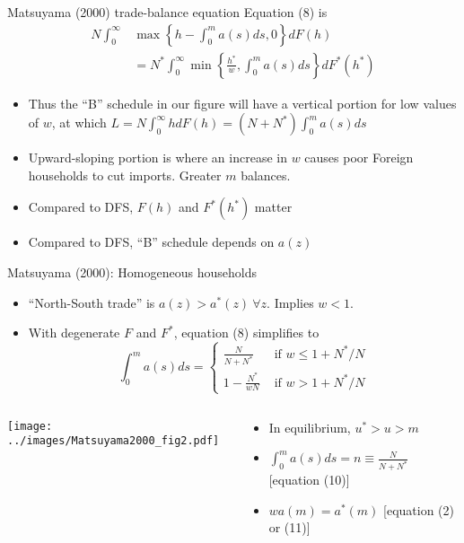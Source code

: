 \documentclass[10pt,notes=hide]{beamer}
\begin{document}
\begin{frame}{Matsuyama (2000) trade-balance equation}
Equation (8) is
\begin{align*} 
N \int_{0}^{\infty} &\max \left\{h-\int_{0}^{m}a(s) ds,0\right\} dF(h) 
\\ 
&= 
N^{*} \int_{0}^{\infty} \min \left\{\frac{h^*}{w},\int_{0}^{m}a(s) ds\right\} dF^{*}(h^*)
\end{align*}
\vspace{-4mm}
\begin{itemize}
	\item Thus the ``B'' schedule in our figure will have a vertical portion for low values of $w$,
	at which $L = N \int_{0}^{\infty} h dF(h) = (N+N^*)\int_{0}^{m}a(s)ds$
	\item Upward-sloping portion is where an increase in $w$ causes poor Foreign households to cut imports. Greater $m$ balances.
	\item Compared to DFS, $F(h)$ and $F^*(h^*)$ matter
	\item Compared to DFS, ``B'' schedule depends on $a(z)$
\end{itemize}
\end{frame}
\begin{frame}{Matsuyama (2000): Homogeneous households}
\begin{itemize}
	\item ``North-South trade'' is $a(z)>a^*(z) \ \forall z$. Implies $w<1$.
	\item With degenerate $F$ and $F^*$, equation (8) simplifies to
		\begin{equation*}
		\int_{0}^{m}a(s) ds = \left\{ 
		\begin{array}{lc}
		\frac{N}{N+N^*} & \text{ if } w \leq 1 + N^*/N \\
		1 - \frac{N^*}{wN} & \text{ if } w > 1 + N^*/N
		\end{array} \right.
		\end{equation*}
\end{itemize}
\begin{columns}
\begin{column}{.49\textwidth}
\texttt{[image: ../images/Matsuyama2000\_fig2.pdf]}
\end{column}
\begin{column}{.49\textwidth}
\begin{itemize}
	\item In equilibrium, $u^*>u>m$
	\item $\int_{0}^{m}a(s) ds = n \equiv \frac{N}{N+N^*}$ [equation (10)]
	\item $w a(m) = a^{*}(m)$ [equation (2) or (11)]
\end{itemize}
\end{column}
\end{columns}
\end{frame}
\end{document}
